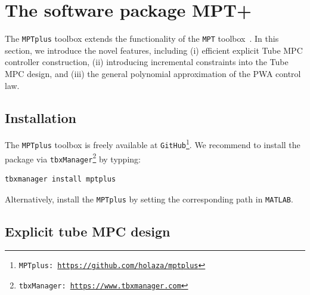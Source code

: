 \documentclass[letterpaper, 10 pt, conference]{ieeeconf}
\begin{document}
\section{The software package MPT+}
\label{sec:code}



The \texttt{MPTplus} toolbox extends the functionality of the \texttt{MPT} toolbox~\cite{MPT3}. In this section, we introduce the novel features, including (i) efficient explicit Tube MPC controller construction, (ii) introducing incremental constraints into the Tube MPC design, and (iii) the general polynomial approximation of the PWA control law. 

\subsection{Installation}
\label{sec:installation}

The \texttt{MPTplus} toolbox is freely available at \texttt{GitHub}\footnote{\texttt{MPTplus: \url{https://github.com/holaza/mptplus}}}. We recommend to install the package via \texttt{tbxManager}\footnote{\texttt{tbxManager: \url{https://www.tbxmanager.com}}} by typping:
\begin{lstlisting}[style=Matlab-editor]
	tbxmanager install mptplus
\end{lstlisting}
Alternatively, install the \texttt{MPTplus} by setting the corresponding path in \texttt{MATLAB}. 


\subsection{Explicit tube MPC design}
\label{sec:mptplus_tube_mpc}
\end{document}
